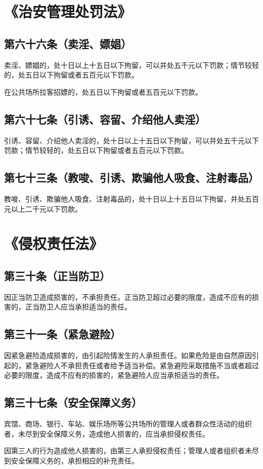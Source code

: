 \documentclass[utf-8,10pt]{ctexart}
\begin{document}
\section{《治安管理处罚法》}
\subsection{第六十六条（卖淫、嫖娼）}
卖淫、嫖娼的，处十日以上十五日以下拘留，可以并处五千元以下罚款；情节较轻的，处五日以下拘留或者五百元以下罚款。

在公共场所拉客招嫖的，处五日以下拘留或者五百元以下罚款。
\subsection{第六十七条（引诱、容留、介绍他人卖淫）}
引诱、容留、介绍他人卖淫的，处十日以上十五日以下拘留，可以并处五千元以下罚款；情节较轻的，处五日以下拘留或者五百元以下罚款。
\subsection{第七十三条（教唆、引诱、欺骗他人吸食、注射毒品）}
教唆、引诱、欺骗他人吸食、注射毒品的，处十日以上十五日以下拘留，并处五百元以上二千元以下罚款。
\section{《侵权责任法》}
\subsection{第三十条（正当防卫）}
因正当防卫造成损害的，不承担责任。正当防卫超过必要的限度，造成不应有的损害的，正当防卫人应当承担适当的责任。
\subsection{第三十一条（紧急避险）}
因紧急避险造成损害的，由引起险情发生的人承担责任。如果危险是由自然原因引起的，紧急避险人不承担责任或者给予适当补偿。紧急避险采取措施不当或者超过必要的限度，造成不应有的损害的，紧急避险人应当承担适当的责任。
\subsection{第三十七条（安全保障义务）}
宾馆、商场、银行、车站、娱乐场所等公共场所的管理人或者群众性活动的组织者，未尽到安全保障义务，造成他人损害的，应当承担侵权责任。

因第三人的行为造成他人损害的，由第三人承担侵权责任；管理人或者组织者未尽到安全保障义务的，承担相应的补充责任。
\end{document}
